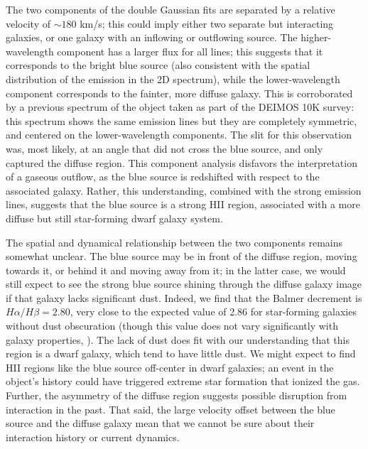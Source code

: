 The two components of the double Gaussian fits are separated by a relative velocity of $\sim180$ km/s; this could imply either two separate but interacting galaxies, or one galaxy with an inflowing or outflowing source.
The higher-wavelength component has a larger flux for all lines; this suggests that it corresponds to the bright blue source (also
consistent with the spatial distribution of
the emission in the 2D spectrum), while the lower-wavelength component corresponds to the fainter, more diffuse galaxy.
This is corroborated by a previous spectrum of the object taken as part of the DEIMOS 10K survey: this spectrum shows the same emission lines but they are completely symmetric, and centered on the lower-wavelength components. 
The slit for this observation was, most likely, at an angle that did not cross the blue source, and only captured the diffuse region.
This component analysis disfavors the interpretation of a gaseous outflow, as the blue source is redshifted with respect to the associated galaxy.
Rather, this understanding, combined with the strong emission lines, suggests that the blue source is a strong HII region, associated with a more diffuse but still star-forming dwarf galaxy system.

The spatial and dynamical relationship between the two components remains somewhat unclear.
The blue source may be in front of the diffuse region, moving towards it, or behind it and moving away from it; in the latter case, we would still expect to see the strong blue source shining through the diffuse galaxy image if that galaxy lacks significant dust.
Indeed, we find that the Balmer decrement is $H\alpha/H\beta = 2.80$, very close to the expected value of 2.86 for star-forming galaxies without dust obscuration (though this value does not vary significantly with galaxy properties, \citealt{Osterbrock2006}).
The lack of dust does fit with our understanding that this region is a dwarf galaxy, which tend to have little dust.
We might expect to find HII regions like the blue source off-center in dwarf galaxies; an event in the object's history could have triggered extreme star formation that ionized the gas.
Further, the asymmetry of the diffuse region suggests possible disruption from interaction in the past.
That said, the large velocity offset between the blue source and the diffuse galaxy mean that we cannot be sure about their interaction history or current dynamics.

